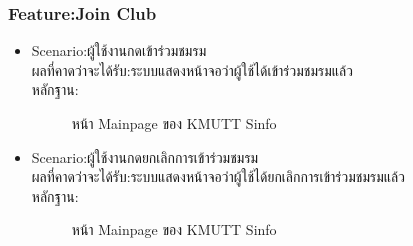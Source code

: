 \documentclass[14pt,oneside,openright,a4paper]{cpe-thai-project}
\begin{document}
\subsubsection{Feature:Join Club}
\begin{itemize}
  \item Scenario:ผู้ใช้งานกดเข้าร่วมชมรม\\ผลที่คาดว่าจะได้รับ:ระบบแสดงหน้าจอว่าผู้ใช้ได้เข้าร่วมชมรมแล้ว\\หลักฐาน:\\
  \begin{figure}[!h]\centering
    \setlength{\fboxrule}{0.5mm} %
    \setlength{\fboxsep}{0.5cm}
    \caption{หน้า Mainpage ของ KMUTT Sinfo}\label{fig:sinfo}
  \end{figure}
\end{itemize}
\newpage
\begin{itemize}
  \item Scenario:ผู้ใช้งานกดยกเลิกการเข้าร่วมชมรม\\ผลที่คาดว่าจะได้รับ:ระบบแสดงหน้าจอว่าผู้ใช้ได้ยกเลิกการเข้าร่วมชมรมแล้ว\\หลักฐาน:\\
  \begin{figure}[!h]\centering
    \setlength{\fboxrule}{0.5mm} %
    \setlength{\fboxsep}{0.5cm}
    \caption{หน้า Mainpage ของ KMUTT Sinfo}\label{fig:sinfo}
  \end{figure}
\end{itemize}
\newpage
\end{document}
